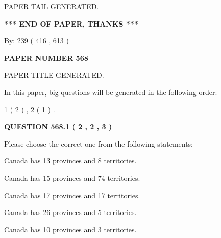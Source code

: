 \documentclass[12pt]{article}
\begin{document}
   
   
\vspace{2.0in} PAPER TAIL GENERATED.
   
   
   
   
\vspace{1.0in} 
{\textbf{\large{ *** END OF PAPER, THANKS *** }}} 
   
   
\hspace{1.0in} By: 
 239 ( 416 ,  613 )
   
   
   
   
\newpage 
\setcounter{page}{ 
   568001 } 
   
   
   
   
 {\textbf{ \Large{ PAPER NUMBER  568  }}}
   
   
\vspace{0.2in}
   
   
   
   
   
   
   
   
 \vspace{0.2in}
 
 
 
 
   
   
 PAPER TITLE GENERATED.
   
   
   
\vspace{0.2in}
   
In this paper, big questions will be generated in the following order: 
   
   
   1 ( 2 )
 ,
   2 ( 1 )
 .
  
\vspace{0.2in}
  
{\textbf{\Large{QUESTION
568.1 
 ( 2 , 2 , 3 )
}}}
  
  
Please choose the correct one from the following statements:
 
 
Canada has  13 provinces and  8 territories.
 
 
Canada has  15 provinces and  74 territories.
 
 
Canada has  17 provinces and  17 territories.
 
 
Canada has  26 provinces and  5 territories.
 
 
Canada has 10  provinces and 3 territories.
 
\end{document}
